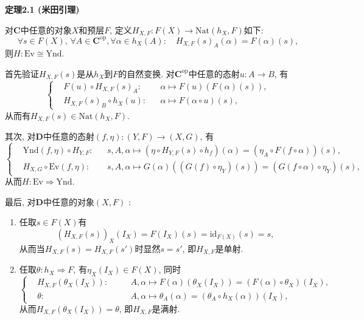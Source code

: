 \documentclass[UTF8]{ctexart}
\begin{document}

\vspace{10pt}

\hypertarget{sec:定理2.1}{}
\noindent\textbf{定理2.1 (米田引理)}

对$\mathbf{C}$中任意的对象$X$和预层$F$,
定义$H_{X,F}:F(X)\to\mathrm{Nat}(h_X,F)$如下:
\[
    \forall s\in F(X),\,\forall A\in\mathbf{C}^{\mathrm{op}},
    \forall\alpha\in h_X(A):\quad H_{X,F}(s)_A(\alpha)=F(\alpha)(s),
\]
则$H:\mathrm{Ev}\cong\mathrm{Ynd}$.


首先验证$H_{X,F}(s)$是从$h_X$到$F$的自然变换.
对$\mathbf{C}^{\mathrm{op}}$中任意的态射$u:A\to B$, 有
\[\left\{\begin{aligned}
    &F(u)\circ H_{X,F}(s)_A:&&\alpha\mapsto F(u)(F(\alpha)(s)),\\[-3pt]
    &H_{X,F}(s)_B\circ h_X(u):&&\alpha\mapsto F(\alpha\circ u)(s),
\end{aligned}\right.\]
从而有$H_{X,F}(s)\in\mathrm{Nat}(h_X,F)$.

其次, 对$\mathbf{D}$中任意的态射$(f,\eta):(Y,F)\to(X,G)$, 有
\[\left\{\begin{aligned}
    &\mathrm{Ynd}(f,\eta)\circ H_{Y,F}:&&s,A,\alpha\mapsto
    (\eta\circ H_{Y,F}(s)\circ h_f)(\alpha)=(\eta_A\circ F(f\circ\alpha))(s),\\[-3pt]
    &H_{X,G}\circ\mathrm{Ev}(f,\eta):&&s,A,\alpha\mapsto
    G(\alpha)((G(f)\circ\eta_Y)(s))=(G(f\circ\alpha)\circ\eta_Y)(s),
\end{aligned}\right.\]
从而$H:\mathrm{Ev}\Rightarrow\mathrm{Ynd}$.

最后, 对$\mathbf{D}$中任意的对象$(X,F)$ :
\begin{enumerate}
    \item 任取$s\in F(X)$有
    \[
        (H_{X,F}(s))_X(I_X)=F(I_X)(s)=\mathrm{id}_{F(X)}(s)=s,
    \]
    从而当$H_{X,F}(s)=H_{X,F}(s')$时显然$s=s'$, 即$H_{X,F}$是单射.
    \item 任取$\theta:h_X\Rightarrow F$, 有$\eta_X(I_X)\in F(X)$, 同时
    \[\left\{\begin{aligned}
        &H_{X,F}(\theta_X(I_X)):\quad&&A,\alpha\mapsto
        F(\alpha)(\theta_X(I_X))=(F(\alpha)\circ\theta_X)(I_X),\\[-3pt]
        &\theta:\quad&&A,\alpha\mapsto
        \theta_A(\alpha)=(\theta_A\circ h_X(\alpha))(I_X),
    \end{aligned}\right.\]
    从而$H_{X,F}(\theta_X(I_X))=\theta$, 即$H_{X,F}$是满射.
\end{enumerate}
\end{document}
